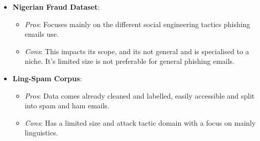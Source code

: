 \begin{itemize}
\begin{itemize}
  \end{itemize}
  \item \textbf{Nigerian Fraud Dataset}:
  \begin{itemize}
    \item \textit{Pros}: Focuses mainly on the different social engineering tactics phishing emails use.
    \item \textit{Cons}: This impacts its scope, and its not general and is specialised to a niche. It's limited size is not preferable for general phishing emails.
  \end{itemize}
  \item \textbf{Ling-Spam Corpus}:
  \begin{itemize}
    \item \textit{Pros}: Data comes already cleaned and labelled, easily accessible and split into spam and ham emails.
    \item \textit{Cons}: Has a limited size and attack tactic domain with a focus on mainly linguistics.
  \end{itemize}
\end{itemize}

